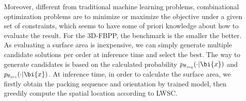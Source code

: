 Moreover, different from traditional machine learning problems, combinational optimization problems are to minimize or maximize the objective under a given set of constraints, which seems to have some of priori knowledge about how to evaluate the result. For the 3D-FBPP, the benchmark is the smaller the better. As evaluating a surface area is inexpensive, we can simply generate multiple candidate solutions per order at inference time and select the best. The way to generate candidates is based on the calculated probability $p_{\theta_{seq}}(\cdot|\bi{x})$ and $p_{\theta_{ori}}(\cdot|\bi{x})$. At inference time, in order to calculate the surface area, we firstly obtain the packing sequence and orientation by trained model, then greedily compute the spatial location according to LWSC. %

